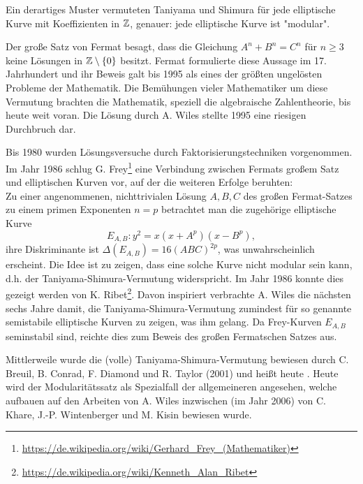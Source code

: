 \begin{bem}
	Ein derartiges Muster vermuteten Taniyama und Shimura für jede elliptische Kurve mit Koeffizienten in $\mathbb{Z}$, genauer:
	jede elliptische Kurve ist "modular".
\end{bem}
	
\begin{bem}
	Der große Satz von Fermat besagt, dass die Gleichung $A^n + B^n = C^n$ für $n \geq 3$ keine Lösungen in $\mathbb{Z} \setminus \{0\}$ besitzt.
	Fermat formulierte diese Aussage im 17. Jahrhundert und ihr Beweis galt bis 1995 als eines der größten ungelösten Probleme der Mathematik.
	Die Bemühungen vieler Mathematiker um diese Vermutung brachten die Mathematik, speziell die algebraische Zahlentheorie, bis heute weit voran.
	Die Lösung durch A. Wiles stellte 1995 eine riesigen Durchbruch dar.
\end{bem}

\begin{bem}
	Bis 1980 wurden Lösungsversuche durch Faktorisierungstechniken vorgenommen.
	Im Jahr 1986 schlug G. Frey\footnote{\url{https://de.wikipedia.org/wiki/Gerhard_Frey_(Mathematiker)}} eine Verbindung zwischen Fermats großem Satz und elliptischen Kurven vor, auf der die weiteren Erfolge beruhten: \\
	Zu einer angenommenen, nichttrivialen Lösung $A,B,C$ des großen Fermat-Satzes zu einem primen Exponenten $n=p$ betrachtet man die zugehörige elliptische Kurve
	\[
		E_{A,B} \colon y^2 = x(x+A^p)(x-B^p),
	\]
	ihre Diskriminante ist $\Delta(E_{A,B}) = 16(ABC)^{2p}$, was unwahrscheinlich erscheint.
	Die Idee ist zu zeigen, dass eine solche Kurve nicht modular sein kann, d.h. der Taniyama-Shimura-Vermutung widerspricht.
	Im Jahr 1986 konnte dies gezeigt werden von K. Ribet\footnote{\url{https://de.wikipedia.org/wiki/Kenneth_Alan_Ribet}}.
	Davon inspiriert verbrachte A. Wiles die nächsten sechs Jahre damit, die Taniyama-Shimura-Vermutung zumindest für so genannte semistabile elliptische Kurven zu zeigen, was ihm gelang.
	Da Frey-Kurven $E_{A,B}$ seminstabil sind, reichte dies zum Beweis des großen Fermatschen Satzes aus.
\end{bem}

\begin{bem}
	Mittlerweile wurde die (volle) Taniyama-Shimura-Vermutung bewiesen durch C. Breuil, B. Conrad, F. Diamond und R. Taylor (2001) und heißt heute .
	Heute wird der Modularitätssatz als Spezialfall der allgemeineren  angesehen, welche aufbauen auf den Arbeiten von A. Wiles inzwischen (im Jahr 2006) von C. Khare, J.-P. Wintenberger und M. Kisin bewiesen wurde.
\end{bem}

